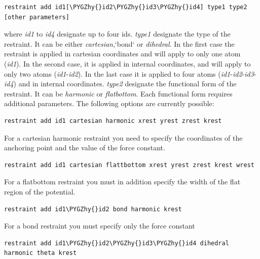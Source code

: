 \documentclass[letterpaper,10pt,english]{sphinxmanual}
\def\PYGZhy{\char`\-}
\begin{document}
\begin{Verbatim}[commandchars=\\\{\}]
restraint add id1[\PYGZhy{}id2\PYGZhy{}id3\PYGZhy{}id4] type1 type2 [other parameters]
\end{Verbatim}

where \emph{id1} to \emph{id4} designate up to four ids. \emph{type1} designate the type of the restraint. It can be either \emph{cartesian},{}`bond{}` or \emph{dihedral}. In the first case the restraint is applied in cartesian coordinates and will apply to only one atom (\emph{id1}). In the second case, it is applied in internal coordinates, and will apply to only two atoms (\emph{id1}-\emph{id2}). In the last case it is applied to four atoms (\emph{id1}-\emph{id2}-\emph{id3}-\emph{id4}) and in internal coordinates. \emph{type2} designate the functional form of the restraint. It can be \emph{harmonic} or \emph{flatbottom}. Each functional form requires additional parameters. The following options are currently possible:

\begin{Verbatim}[commandchars=\\\{\}]
restraint add id1 cartesian harmonic xrest yrest zrest krest
\end{Verbatim}

For a cartesian harmonic restraint you need to specify the coordinates of the anchoring point and the value of the force constant.

\begin{Verbatim}[commandchars=\\\{\}]
restraint add id1 cartesian flattbottom xrest yrest zrest krest wrest
\end{Verbatim}

For a flatbottom restraint you must in addition specify the width of the flat region of the potential.

\begin{Verbatim}[commandchars=\\\{\}]
restraint add id1\PYGZhy{}id2 bond harmonic krest
\end{Verbatim}

For a bond restraint you must specify only the force constant

\begin{Verbatim}[commandchars=\\\{\}]
restraint add id1\PYGZhy{}id2\PYGZhy{}id3\PYGZhy{}id4 dihedral harmonic theta krest
\end{Verbatim}
\end{document}
